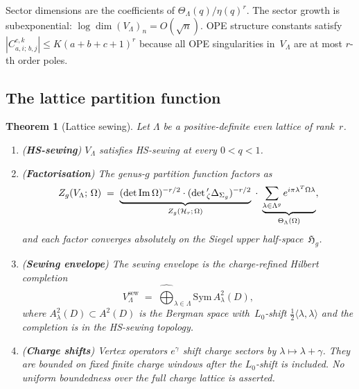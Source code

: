\documentclass[11pt,reqno]{amsart}
\newtheorem{theorem}{Theorem}[section]
\theoremstyle{definition}
\theoremstyle{remark}
\newcommand{\cH}{\mathcal{H}}
\newcommand{\Sym}{\mathrm{Sym}}
\newcommand{\fH}{\mathfrak{H}}
\numberwithin{equation}{section}
\begin{document}
Sector dimensions are the coefficients of
$\Theta_\Lambda(q)/\eta(q)^r$. The
sector growth is subexponential:
$\log\dim(V_\Lambda)_n = O(\sqrt{n})$.  OPE structure
constants satisfy
$|C^{c,k}_{a,i;\,b,j}| \leq K(a+b+c+1)^r$ because all OPE
singularities in~$V_\Lambda$ are at most $r$-th order poles.

\subsection{The lattice partition function}
\label{subsec:lattice-partition}

\begin{theorem}[Lattice sewing]\label{thm:lattice-sewing}
Let $\Lambda$ be a positive-definite even lattice of rank~$r$.
\begin{enumerate}[label=\textup{(\roman*)}]
\item (\textbf{HS-sewing})\; $V_\Lambda$ satisfies HS-sewing
 at every $0 < q < 1$.
\item (\textbf{Factorisation})\; The genus-$g$ partition
 function factors as
 \begin{equation}\label{eq:lattice-partition}
 Z_g(V_\Lambda;\,\Omega)
 \;=\;
 \underbrace{(\det\operatorname{Im}\Omega)^{-r/2}
 \cdot (\det{}'_\zeta \Delta_{\Sigma_g})^{-r/2}}_{%
  Z_g(\cH_r;\,\Omega)}
 \;\cdot\;
 \underbrace{\sum_{\lambda \in \Lambda^g}
  e^{i\pi \lambda^T \Omega \lambda}}_{%
  \Theta_\Lambda(\Omega)},
 \end{equation}
 and each factor converges absolutely on the Siegel upper
 half-space~$\fH_g$.
\item (\textbf{Sewing envelope})\; The sewing envelope is the
 charge-refined Hilbert completion
 \begin{equation}\label{eq:lattice-sewing-envelope}
 V_\Lambda^{\mathrm{sew}}
 \;=\;
 \widehat{\bigoplus}_{\lambda \in \Lambda}
 \Sym\, A^2_\lambda(D),
 \end{equation}
 where $A^2_\lambda(D) \subset A^2(D)$ is the Bergman space
 with~$L_0$-shift
 $\tfrac{1}{2}\langle\lambda,\lambda\rangle$ and the completion
 is in the HS-sewing topology.
\item (\textbf{Charge shifts})\; Vertex operators $e^\gamma$
 shift charge sectors by $\lambda\mapsto\lambda+\gamma$. They are
 bounded on fixed finite charge windows after the $L_0$-shift is
 included. No uniform boundedness over the full charge lattice is
 asserted.
\end{enumerate}
\end{theorem}
\end{document}
